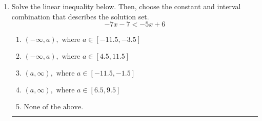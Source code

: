 \documentclass[14pt]{extbook}
\newcommand{\litem}[1]{\item#1\hspace*{-1cm}\rule{\textwidth}{0.4pt}}
\begin{document}
\begin{enumerate}
{\begin{enumerate}[label=\Alph*.]
\end{enumerate} }
\litem{
Solve the linear inequality below. Then, choose the constant and interval combination that describes the solution set.\[ -7x -7 < -5x + 6 \]\begin{enumerate}[label=\Alph*.]
\item \( (-\infty, a), \text{ where } a \in [-11.5, -3.5] \)
\item \( (-\infty, a), \text{ where } a \in [4.5, 11.5] \)
\item \( (a, \infty), \text{ where } a \in [-11.5, -1.5] \)
\item \( (a, \infty), \text{ where } a \in [6.5, 9.5] \)
\item \( \text{None of the above}. \)

\end{enumerate} }
\end{enumerate}
\end{document}
